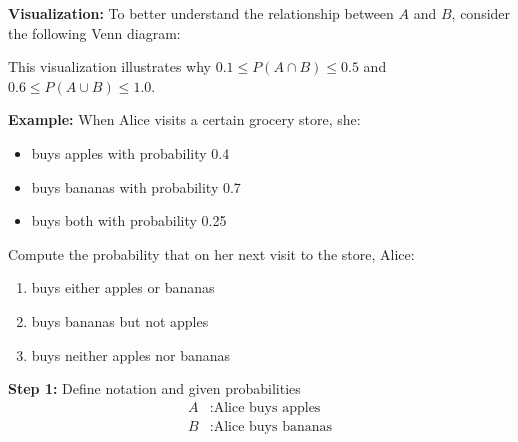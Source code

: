 \documentclass{article}
\begin{document}
\textbf{Visualization:} To better understand the relationship between $A$ and $B$, consider the following Venn diagram:
\begin{center}
\end{center}

This visualization illustrates why $0.1 \leq P(A \cap B) \leq 0.5$ and $0.6 \leq P(A \cup B) \leq 1.0$.



\textbf{Example:} When Alice visits a certain grocery store, she:
\begin{itemize}
    \item buys apples with probability 0.4
    \item buys bananas with probability 0.7
    \item buys both with probability 0.25
\end{itemize}

Compute the probability that on her next visit to the store, Alice:
\begin{enumerate}
    \item buys either apples or bananas
    \item buys bananas but not apples
    \item buys neither apples nor bananas
\end{enumerate}

\textbf{Step 1:} Define notation and given probabilities
\begin{align*}
    A &: \text{Alice buys apples} \\
    B &: \text{Alice buys bananas}
\end{align*}
\end{document}
